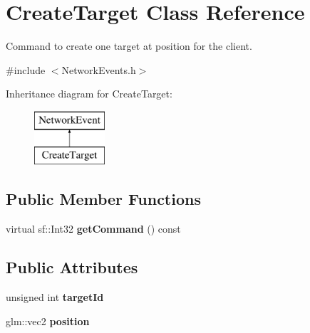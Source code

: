 \hypertarget{class_create_target}{\section{Create\-Target Class Reference}
\label{class_create_target}
}


Command to create one target at position for the client.  




{\ttfamily \#include $<$Network\-Events.\-h$>$}

Inheritance diagram for Create\-Target\-:\begin{figure}[H]
\begin{center}
\leavevmode
\includegraphics[height=2.000000cm]{class_create_target}
\end{center}
\end{figure}
\subsection*{Public Member Functions}
\begin{DoxyCompactItemize}
\item 
\hypertarget{class_create_target_ac23134e69bdccc45c07f3932eeef6b80}{virtual sf\-::\-Int32 {\bfseries get\-Command} () const }\label{class_create_target_ac23134e69bdccc45c07f3932eeef6b80}

\end{DoxyCompactItemize}
\subsection*{Public Attributes}
\begin{DoxyCompactItemize}
\item 
\hypertarget{class_create_target_a88833d79d83a7db0906a759fb03b10e9}{unsigned int {\bfseries target\-Id}}\label{class_create_target_a88833d79d83a7db0906a759fb03b10e9}

\item 
\hypertarget{class_create_target_a89b1d2edc2c1c1098b9d494e2aa13c98}{glm\-::vec2 {\bfseries position}}\label{class_create_target_a89b1d2edc2c1c1098b9d494e2aa13c98}

\end{DoxyCompactItemize}

